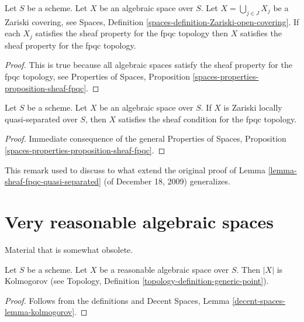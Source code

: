 \begin{lemma}
\label{lemma-sheaf-fpqc-open-covering}
Let $S$ be a scheme. Let $X$ be an algebraic space over $S$.
Let $X = \bigcup_{j \in J} X_j$ be a Zariski covering, see
Spaces, Definition \ref{spaces-definition-Zariski-open-covering}.
If each $X_j$ satisfies the sheaf property for the fpqc topology
then $X$ satisfies the sheaf property for the fpqc topology.
\end{lemma}

\begin{proof}
This is true because all algebraic spaces satisfy the sheaf property
for the fpqc topology, see
Properties of Spaces, Proposition
\ref{spaces-properties-proposition-sheaf-fpqc}.
\end{proof}

\begin{lemma}
\label{lemma-sheaf-fpqc-quasi-separated}
Let $S$ be a scheme. Let $X$ be an algebraic space over $S$.
If $X$ is Zariski locally quasi-separated over $S$, then $X$ satisfies
the sheaf condition for the fpqc topology.
\end{lemma}

\begin{proof}
Immediate consequence of the general
Properties of Spaces, Proposition
\ref{spaces-properties-proposition-sheaf-fpqc}.
\end{proof}

\begin{remark}
\label{remark-proof-works-when}
This remark used to discuss to what extend the original proof of
Lemma \ref{lemma-sheaf-fpqc-quasi-separated} (of December 18, 2009)
generalizes.
\end{remark}






\section{Very reasonable algebraic spaces}
\label{section-very-reasonable}

\noindent
Material that is somewhat obsolete.

\begin{lemma}
\label{lemma-reasonable-kolmogorov}
Let $S$ be a scheme.
Let $X$ be a reasonable algebraic space over $S$.
Then $|X|$ is Kolmogorov (see
Topology, Definition \ref{topology-definition-generic-point}).
\end{lemma}

\begin{proof}
Follows from the definitions and
Decent Spaces, Lemma \ref{decent-spaces-lemma-kolmogorov}.
\end{proof}

